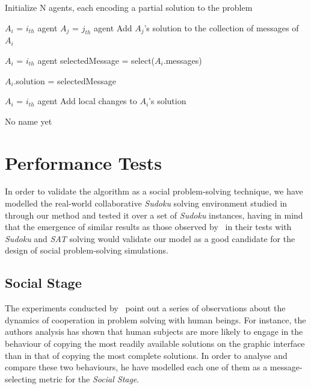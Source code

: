 \documentclass{article}
\begin{document}
\begin{algorithm}
 \SetAlgoLined
 Initialize N agents, each encoding a partial solution to the problem\;
 {
 	{
 		{
 			{
 				$A_{i}$ = $i_{th}$ agent\;
 				$A_{j}$ = $j_{th}$ agent\;
 				Add $A_{j}$'s solution to the collection of messages of $A_{i}$\; %
 			}
 		}
 	}
 	{
 		\;
 		$A_{i}$ = $i_{th}$ agent\;
 		selectedMessage = select($A_{i}$.messages)\;
 		
 		{
 			$A_{i}$.solution = selectedMessage\;
 		}
 	}
 	{
 		\;
 		$A_{i}$ = $i_{th}$ agent\;
 		Add local changes to $A_{i}$'s solution%
 	}
 }
 \caption{No name yet}
\end{algorithm}

\section{Performance Tests}

In order to validate the algorithm as a social problem-solving technique, we have modelled the real-world collaborative {\em Sudoku} solving environment studied in~\cite{farenzena:collabem} through our method and tested it over a set of {\em Sudoku} instances, having in mind that the emergence of similar results as those observed by~\cite{farenzena:collabem} in their tests with {\em Sudoku} and {\em SAT} solving would validate our model as a good candidate for the design of social problem-solving simulations.

\subsection{Social Stage}

The experiments conducted by~\cite{farenzena:collabem} point out a series of observations about the dynamics of cooperation in problem solving with human beings. For instance, the authors analysis has shown that human subjects are more likely to engage in the behaviour of copying the most readily available solutions on the graphic interface than in that of copying the most complete solutions. In order to analyse and compare these two behaviours, he have modelled each one of them as a message-selecting metric for the {\em Social Stage}.
\end{document}
